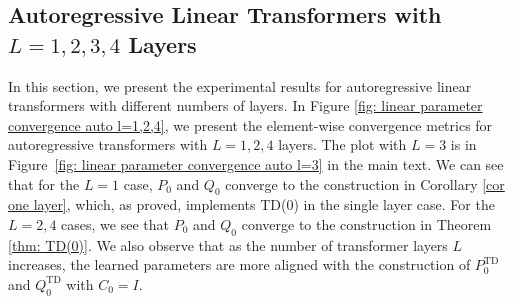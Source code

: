 \documentclass{article}
\newcommand{\td}{\text{TD}}
\begin{document}
\subsection[Autoregressive Linear Transformers with L = 1, 2, 3, 4 Layers]{Autoregressive Linear Transformers with $L=1,2,3,4$ Layers} \label{appendix: autoregressive experiments}
In this section,
we present the experimental results for autoregressive linear transformers with different numbers of layers. 
In Figure \ref{fig: linear parameter convergence auto l=1,2,4}, we present the element-wise convergence metrics for autoregressive transformers with $L=1,2,4$ layers.
The plot with $L = 3$ is in Figure~\ref{fig: linear parameter convergence auto l=3} in the main text.
We can see that for the $L=1$ case, $P_0$ and $Q_0$ converge to the construction in Corollary \ref{cor one layer},
which, as proved, implements TD(0) in the single layer case.  
For the $L=2,4$ cases, we see that $P_0$ and $Q_0$ converge to the construction in Theorem \ref{thm: TD(0)}. 
We also observe that as the number of transformer layers $L$ increases,
the learned parameters are more aligned with the construction of $P_0^{\td}$ and $Q_0^{\td}$ with $C_0=I$.
\end{document}
